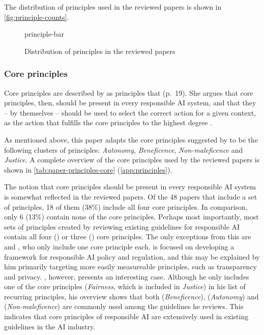 The distribution of principles used in the reviewed papers is shown in \autoref{fig:principle-counts}.

\begin{figure}[ht]
    \centering
    {principle-bar}
    \caption{Distribution of principles in the reviewed papers}
    \label{fig:principle-counts}
\end{figure}


\subsubsection{Core principles}
Core principles are described by \textcite{Canca_2020} as principles that  (p.~19). She argues that core principles, then, should be present in every responsible AI system, and that they -- by themselves -- should be used to select the correct action for a given context, as the action that fulfills the core principles to the highest degree \parencite{Canca_2020}.

As mentioned above, this paper adapts the core principles suggested by \textcite{Canca_2020} to be the following clusters of principles: \textit{Autonomy}, \textit{Beneficence}, \textit{Non-maleficence} and \textit{Justice}. A complete overview of the core principles used by the reviewed papers is shown in \autoref{tab:paper-principles-core} (\autoref{app:principles}).

The notion that core principles should be present in every responsible AI system is somewhat reflected in the reviewed papers. Of the 48 papers that include a set of principles, 18 of them (38\%) include all four core principles. In comparison, only 6 (13\%) contain none of the core principles. Perhaps most importantly, most sets of principles created by reviewing existing guidelines for responsible AI contain all four (\cite{Clarke_2019,Floridi_2018,Jobin_2019,Ryan_2021}) or three (\cite{Fjeld_2020}) core principles. The only exceptions from this are \textcite{Brand_2022} and \textcite{Hagendorff_2020}, who only include one core principle each. \textcite{Brand_2022} is focused on developing a framework for responsible AI policy and regulation, and this may be explained by him primarily targeting more easily measureable principles, such as transparency and privacy. \textcite{Hagendorff_2020}, however, presents an interesting case. Although he only includes one of the core principles (\textit{Fairness}, which is included in \textit{Justice}) in his list of recurring principles, his overview \parencite[Table 1]{Hagendorff_2020} shows that both  (\textit{Beneficence}),  (\textit{Autonomy}) and  (\textit{Non-maleficence}) are commonly used among the guidelines he reviews. This indicates that core principles of responsible AI are extensively used in existing guidelines in the AI industry. 

